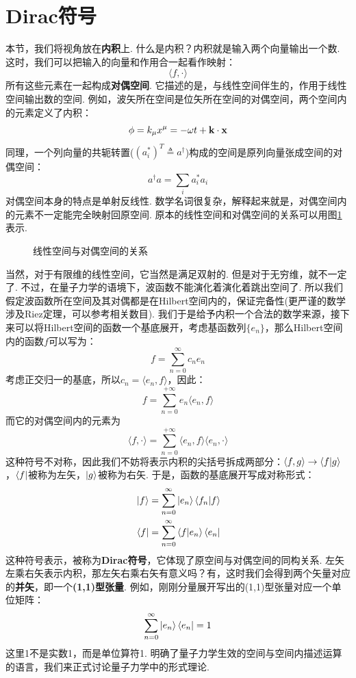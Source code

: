 \section{Dirac符号}
本节，我们将视角放在\textbf{内积}上. 什么是内积？内积就是输入两个向量输出一个数. 这时，我们可以把输入的向量和作用合一起看作映射：
\[
\langle f,\cdot\rangle
\]
所有这些元素在一起构成\textbf{对偶空间}. 它描述的是，与线性空间伴生的，作用于线性空间输出数的空间. 例如，波矢所在空间是位矢所在空间的对偶空间，两个空间内的元素定义了内积：
\[
\phi = k_{\mu}x^{\mu} = -\omega t + \mathbf{k}\cdot\mathbf{x}
\]
同理，一个列向量的共轭转置(\((a_{i}^{*})^{T}\triangleq a^{\dagger}\))构成的空间是原列向量张成空间的对偶空间：
\[
a^\dagger a = \sum_{i}a^{*}_{i}a_{i}
\]
对偶空间本身的特点是单射反线性. 数学名词很复杂，解释起来就是，对偶空间内的元素不一定能完全映射回原空间. 原本的线性空间和对偶空间的关系可以用图\ref{The_relation_between_the_Linear_Space_and_its_CP}表示. 
\begin{figure}
    \centering
    \caption{线性空间与对偶空间的关系}
    \label{The_relation_between_the_Linear_Space_and_its_CP}
\end{figure}
当然，对于有限维的线性空间，它当然是满足双射的. 但是对于无穷维，就不一定了. 不过，在量子力学的语境下，波函数不能演化着演化着跳出空间了. 所以我们假定波函数所在空间及其对偶都是在Hilbert空间内的，保证完备性(更严谨的数学涉及Riez定理，可以参考相关数目). 我们于是给予内积一个合法的数学来源，接下来可以将Hilbert空间的函数一个基底展开，考虑基函数列\(\{e_{n}\}\)，那么Hilbert空间内的函数\(f\)可以写为：
\[
f = \sum_{n=0}^{\infty}c_{n}e_{n}
\]
考虑正交归一的基底，所以\(c_{n} = \langle e_{n},f\rangle\)，因此：
\[
f = \sum_{n=0}^{+\infty}e_{n}\langle e_{n},f\rangle
\]
而它的对偶空间内的元素为
\[
\langle f,\cdot\rangle = \sum_{n=0}^{+\infty}\langle e_{n},f\rangle\langle e_{n},\cdot\rangle
\]
这种符号不对称，因此我们不妨将表示内积的尖括号拆成两部分：\(\langle f,g\rangle\to\braket{f}{g}\)，\(\bra{f}\)被称为左矢，\(\ket{g}\)被称为右矢. 于是，函数的基底展开写成对称形式：
\begin{align*}
& \ket{f} = \sum_{n=0}^{\infty}\ket{e_{n}}\bra{f_n}\ket{f} \\
& \bra{f} = \sum_{n=0}^{\infty}\bra{f}\ket{e_{n}}\bra{e_{n}}
\end{align*}
这种符号表示，被称为\textbf{Dirac符号}，它体现了原空间与对偶空间的同构关系. 左矢左乘右矢表示内积，那左矢右乘右矢有意义吗？有，这时我们会得到两个矢量对应的\textbf{并矢}，即一个\textbf{(1,1)型张量}. 例如，刚刚分量展开写出的(1,1)型张量对应一个单位矩阵：
\[
\sum_{n=0}^{\infty}\ket{e_{n}}\bra{e_{n}} = 1
\]
这里1不是实数1，而是单位算符1. 明确了量子力学生效的空间与空间内描述运算的语言，我们来正式讨论量子力学中的形式理论. 
